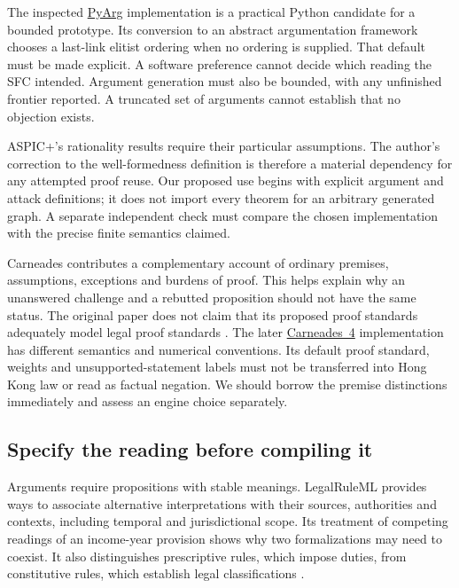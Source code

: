 The inspected \href{https://github.com/DaphneOdekerken/PyArg}{PyArg}
implementation is a practical Python candidate for a bounded prototype.
Its conversion to an abstract argumentation framework chooses a last-link
elitist ordering when no ordering is supplied. That default must be made
explicit. A software preference cannot decide which reading the SFC intended.
Argument generation must also be bounded, with any unfinished frontier
reported. A truncated set of arguments cannot establish that no objection
exists.

ASPIC+'s rationality results require their particular assumptions. The
author's correction to the well-formedness definition is therefore a material
dependency for any attempted proof reuse. Our proposed use begins with
explicit argument and attack definitions; it does not import every theorem
for an arbitrary generated graph. A separate independent check must compare
the chosen implementation with the precise finite semantics claimed.

Carneades contributes a complementary account of ordinary premises,
assumptions, exceptions and burdens of proof. This helps explain why an
unanswered challenge and a rebutted proposition should not have the same
status. The original paper does not claim that its proposed proof standards
adequately model legal proof standards \citep[secs.~3--5]{carneades2007}.
The later \href{https://github.com/carneades/carneades-4}{Carneades~4}
implementation has different semantics and numerical conventions. Its
default proof standard, weights and unsupported-statement labels must not
be transferred into Hong Kong law or read as factual negation. We should
borrow the premise distinctions immediately and assess an engine choice
separately.

\subsection{Specify the reading before compiling it}

Arguments require propositions with stable meanings. LegalRuleML provides
ways to associate alternative interpretations with their sources,
authorities and contexts, including temporal and jurisdictional scope.
Its treatment of competing readings of an income-year provision shows why
two formalizations may need to coexist. It also distinguishes prescriptive
rules, which impose duties, from constitutive rules, which establish legal
classifications \citep[secs.~3--4]{legalinterpretations2014}.

